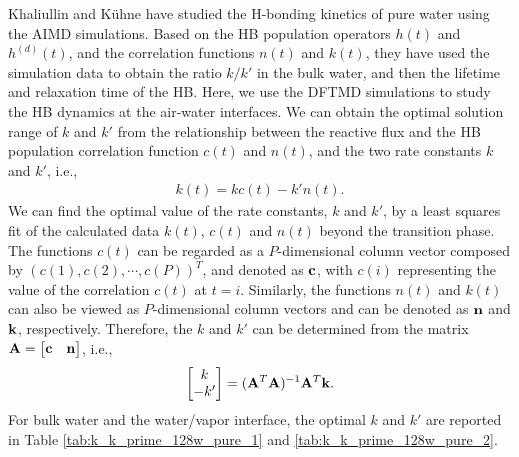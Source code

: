 Khaliullin and K\"uhne have studied the H-bonding kinetics of pure water using the AIMD simulations.\cite{Khaliullin2013}
Based on the HB population operators $h(t)$ and $h^{(d)}(t)$, and the correlation functions $n(t)$ and $k(t)$, they have used the simulation data 
to obtain the ratio $k/k'$ in the bulk water, and then the lifetime and relaxation time 
of the HB.  Here, we use the DFTMD simulations to study the HB dynamics at the air-water interfaces.
We can obtain the optimal solution range of $k$ and $k'$ from the relationship between the reactive flux 
and the HB population correlation function $c(t)$ and $n(t)$, and the two rate constants $k$ and $k'$, i.e.,
\begin{eqnarray}
  k(t) = kc(t)-k'n(t).
\label{eq:fitting_k_rates}
\end{eqnarray}
We can find the optimal value of the rate constants, $k$ and $k'$, 
by a least squares fit of the calculated data $k(t)$, $c(t)$ and $n(t)$ beyond the transition phase.  
The functions $c(t)$ can be regarded as a $P$-dimensional column vector composed by $(c(1),c(2),\cdots,c(P))^T$, and denoted as ${\bf c}$,
with $c(i)$ representing the value of the correlation $c(t)$ at $t=i$.
Similarly, the functions $n(t)$ and $k(t)$ can also be viewed as $P$-dimensional column vectors and can be denoted as ${\bf n}$ and ${\bf k}$, respectively.
Therefore, the $k$ and $k'$ can be determined from the matrix ${\bf A} = \begin{bmatrix} {\bf c} & {\bf n} \end{bmatrix}$, i.e., 
\begin{equation}
\begin{bmatrix} k\\ -k' \end{bmatrix} = ({\bf A}^T {\bf A})^{-1} {\bf A}^T {\bf k}. 
\end{equation}
For bulk water and the water/vapor interface, the optimal $k$ and $k'$ are reported in Table 
\ref{tab:k_k_prime_128w_pure_1} and \ref{tab:k_k_prime_128w_pure_2}. 
% 
